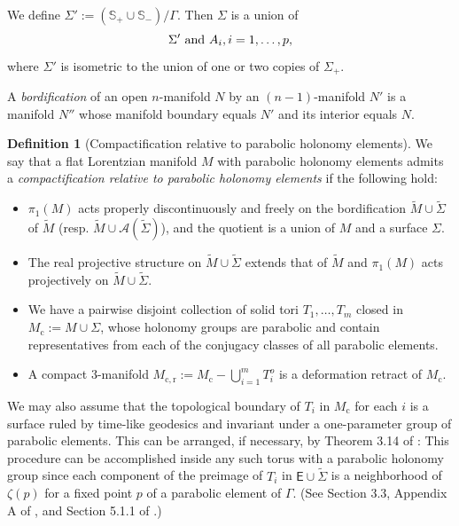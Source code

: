 \documentclass{amsart}
\numberwithin{equation}{section}
\newcommand\bR{{\mathbb{R}}}
\newcommand\SL{{\mathsf{SL}}}
\newcommand\Ss{{\mathbb{S}}}
\newcommand\Lspace{\mathsf E}
\theoremstyle{definition}
\newtheorem{definition}{Definition}[section]
\theoremstyle{remark}
\newcommand{\romec}{\mathrm{c}}
\newcommand{\romecr}{{\mathrm{c}, \mathrm{r}}}
\begin{document}
We define $\Sigma' := (\Ss_+ \cup \Ss_-)/\Gamma$. 
Then $\Sigma$ is a union of 
\[\Sigma' \hbox{ and } A_i, i=1, \dots, p,\] 
where $\Sigma'$ is isometric to the union of one or two copies of $\Sigma_+$. 

A {\em bordification} of an open $n$-manifold $N$ by an $(n-1)$-manifold $N'$
is a manifold $N''$ whose manifold boundary equals $N'$ and its interior equals $N$. 

\begin{definition}[Compactification relative to parabolic holonomy elements] \label{defn:rcomp}
We say that a flat Lorentzian manifold $M$ with parabolic holonomy elements 
admits a {\em compactification relative to parabolic holonomy elements} if 
the following hold:
\begin{itemize}
\item $\pi_1(M)$ acts properly discontinuously and freely on
the bordification $\tilde M \cup \tilde \Sigma$ of $\tilde M$ 
(resp. $\tilde M \cup \mathcal{A}(\tilde \Sigma)$), and the quotient is a union of $M$ and a surface $\Sigma$. 
\item The real projective structure on $\tilde M \cup \tilde \Sigma$ extends 
that of $\tilde M$ and $\pi_1(M)$ acts projectively on $\tilde M \cup \tilde \Sigma$. 
\item We have a pairwise disjoint collection of solid tori
$T_1, \dots, T_m$ closed in $M_\romec:= M \cup \Sigma$, 
whose holonomy groups are parabolic and contain
representatives from each of the conjugacy classes of all parabolic elements. 
\item A compact $3$-manifold $M_\romecr:= M_\romec - \bigcup_{i=1}^m T_i^o$ is a deformation retract of $M_\romec$. 
\end{itemize}
\end{definition}

We may also assume that the topological 
boundary of $T_i$ in $M_\romec$ for each $i$  is a surface ruled by time-like geodesics and invariant 
under a one-parameter group of parabolic elements. 
This can be arranged, if necessary, by Theorem 3.14 of \cite{CDG22}:
This procedure can be accomplished inside any such torus with a parabolic holonomy group
since each component of the preimage of $T_i$ in $\Lspace \cup \tilde \Sigma$ is a neighborhood of $\zeta(p)$ for a fixed point $p$ of a parabolic element of $\Gamma$. 
(See Section 3.3, 
Appendix A of \cite{CDG22}, and Section 5.1.1 of \cite{CDG22}.)
\end{document}

